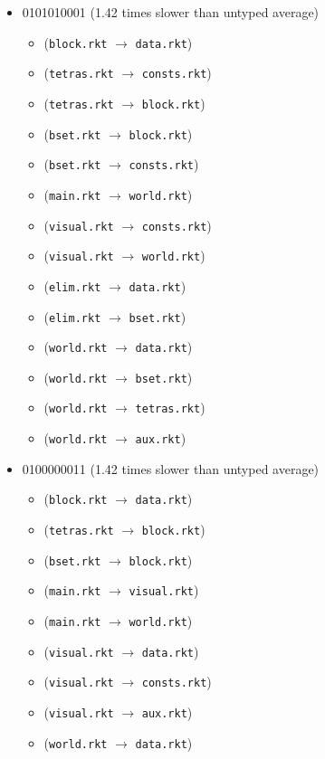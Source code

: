 \documentclass{article}
\newcommand{\mono}[1]{\texttt{#1}}
\begin{document}
\begin{itemize}
\begin{itemize}
  \end{itemize}
\item 0101010001 (1.42 times slower than untyped average)
  \begin{itemize}
  \item (\mono{block.rkt} $\rightarrow$ \mono{data.rkt})
  \item (\mono{tetras.rkt} $\rightarrow$ \mono{consts.rkt})
  \item (\mono{tetras.rkt} $\rightarrow$ \mono{block.rkt})
  \item (\mono{bset.rkt} $\rightarrow$ \mono{block.rkt})
  \item (\mono{bset.rkt} $\rightarrow$ \mono{consts.rkt})
  \item (\mono{main.rkt} $\rightarrow$ \mono{world.rkt})
  \item (\mono{visual.rkt} $\rightarrow$ \mono{consts.rkt})
  \item (\mono{visual.rkt} $\rightarrow$ \mono{world.rkt})
  \item (\mono{elim.rkt} $\rightarrow$ \mono{data.rkt})
  \item (\mono{elim.rkt} $\rightarrow$ \mono{bset.rkt})
  \item (\mono{world.rkt} $\rightarrow$ \mono{data.rkt})
  \item (\mono{world.rkt} $\rightarrow$ \mono{bset.rkt})
  \item (\mono{world.rkt} $\rightarrow$ \mono{tetras.rkt})
  \item (\mono{world.rkt} $\rightarrow$ \mono{aux.rkt})
  \end{itemize}
\item 0100000011 (1.42 times slower than untyped average)
  \begin{itemize}
  \item (\mono{block.rkt} $\rightarrow$ \mono{data.rkt})
  \item (\mono{tetras.rkt} $\rightarrow$ \mono{block.rkt})
  \item (\mono{bset.rkt} $\rightarrow$ \mono{block.rkt})
  \item (\mono{main.rkt} $\rightarrow$ \mono{visual.rkt})
  \item (\mono{main.rkt} $\rightarrow$ \mono{world.rkt})
  \item (\mono{visual.rkt} $\rightarrow$ \mono{data.rkt})
  \item (\mono{visual.rkt} $\rightarrow$ \mono{consts.rkt})
  \item (\mono{visual.rkt} $\rightarrow$ \mono{aux.rkt})
  \item (\mono{world.rkt} $\rightarrow$ \mono{data.rkt})

\end{itemize}
\end{itemize}
\end{document}
